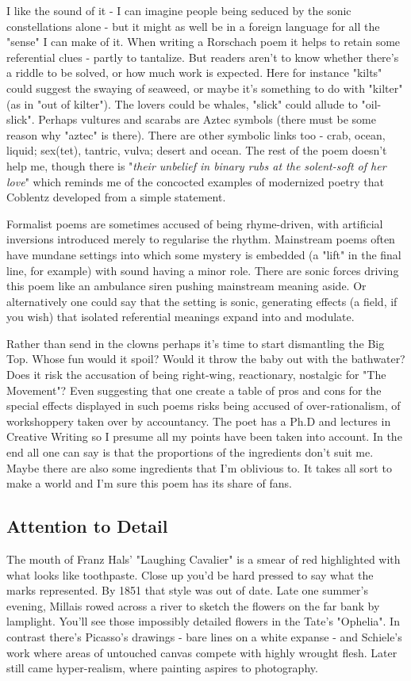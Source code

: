 \documentclass[11pt]{article}
\begin{document}
I like the sound of it - I can imagine people being seduced by the sonic constellations alone - but it might as well be in a foreign language for all the "sense" I can make of it. When writing a Rorschach poem it helps to retain some referential clues - partly to tantalize. But readers aren't to know whether there's a riddle to be solved, or how much work is expected. Here for instance "kilts" could suggest the swaying of seaweed, or maybe it's something to do with "kilter" (as in "out of kilter"). The lovers could be whales, "slick" could allude to "oil-slick". Perhaps vultures and scarabs are Aztec symbols (there must be some reason why "aztec" is there). There are other symbolic links too - crab, ocean, liquid; sex(tet), tantric, vulva; desert and ocean. The rest of the poem doesn't help me, though there is "\textit{their unbelief in binary rubs at the solent-soft of her love}" which reminds me of the concocted examples of modernized poetry that  Coblentz developed from a simple statement. 

Formalist poems are sometimes accused of being rhyme-driven, with artificial inversions introduced merely to regularise the rhythm.  Mainstream poems often have mundane settings into which some mystery is embedded (a "lift" in the final line, for example) with sound having a minor role. There are sonic forces driving this poem like an ambulance siren pushing mainstream meaning aside. Or alternatively one could say that  the setting is sonic, generating effects (a field, if you wish) that isolated referential meanings expand into and modulate.


Rather than send in the clowns perhaps it's time to start dismantling the Big Top. Whose fun would it  spoil? Would it throw the baby out with the bathwater? Does it risk the accusation of being right-wing, reactionary, nostalgic for "The Movement"? Even suggesting that one create a table of pros and cons for the special effects displayed in such poems  risks being accused of over-rationalism, of workshoppery taken over by accountancy. The poet has a Ph.D and lectures in Creative Writing so I presume all my points have been taken into account. In the end all one can say is that the proportions of the ingredients don't suit me. Maybe there are also some ingredients that I'm oblivious to. It takes all sort to make a world and I'm sure this poem has its share of fans.


\newpage\subsection{Attention to Detail}
The mouth of Franz Hals' "Laughing Cavalier" is a smear of red highlighted with what looks like toothpaste. Close up you'd be hard pressed to say what the marks represented. By 1851 that style was out of date. Late one summer's evening, Millais rowed across a river to sketch the flowers on the far bank by lamplight. You'll see those impossibly detailed flowers in the Tate's "Ophelia". In contrast there's Picasso's drawings - bare lines on a white expanse - and Schiele's work where areas of untouched canvas compete with highly wrought flesh. Later still came hyper-realism, where painting aspires to photography.
\end{document}
